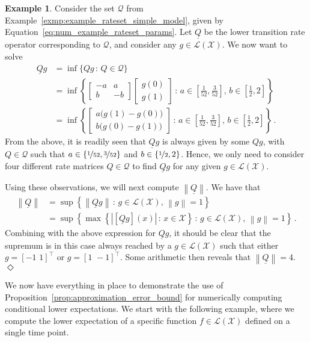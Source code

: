 \documentclass[10pt,a4paper]{paper}
\theoremstyle{definition}
\newtheorem{exmp}{Example}%
\newcommand{\states}{\mathcal{X}}
\newcommand{\gambles}{\mathcal{L}}
\newcommand{\gamblesX}{\gambles(\states)}
\newcommand{\rateset}{\mathcal{Q}}
\newcommand{\lrate}{\underline{Q}}
\newcommand{\norm}[1]{\left\lVert #1 \right\rVert}
\newcommand{\abs}[1]{\left\vert #1 \right\vert}
\newcommand{\exampleend}{\hfill$\Diamond$}
\begin{document}
\begin{exmp}\label{exmp:numerical_lrate}
Consider the set $\rateset$ from Example~\ref{exmp:example_rateset_simple_model}, given by Equation~\eqref{eq:num_example_rateset_params}. Let $\lrate$ be the lower transition rate operator corresponding to $\rateset$, and consider any $g\in\gamblesX$. We now want to solve
\begin{align*}
\lrate g &= \inf\{Qg\,:\,Q\in\rateset\} \\
 &= \inf\left\{\left[\begin{array}{rr}-a & a \\b & -b\end{array}\right]\left[\begin{array}{r} g(0) \\ g(1) \end{array}\right]\,:\,a\in\left[\frac{1}{52}, \frac{3}{52} \right],\,b\in\left[\frac{1}{2}, 2 \right]\right\} \\
 &= \inf\left\{ \left[\begin{array}{r} a\bigl(g(1) - g(0)\bigr) \\ b\bigl(g(0) - g(1) \bigr)\end{array} \right]\,:\,a\in\left[\frac{1}{52}, \frac{3}{52} \right],\,b\in\left[\frac{1}{2}, 2 \right]\right\}\,.
\end{align*}
From the above, it is readily seen that $\lrate g$ is always given by some $Q g$, with $Q\in\rateset$ such that $a\in\{\nicefrac{1}{52}, \nicefrac{3}{52}\}$ and $b\in\{\nicefrac{1}{2},2\}$. Hence, we only need to consider four different rate matrices $Q\in\rateset$ to find $\lrate g$ for any given $g\in\gamblesX$.

Using these observations, we will next compute $\norm{\lrate}$. We have that
\begin{align*}
\norm{\lrate} &= \sup\left\{ \norm{\lrate g}\,:\,g\in\gamblesX,\, \norm{g}=1 \right\} \\
 &= \sup\left\{ \max\left\{\abs{\left[\lrate g\right](x)}\,:\,x\in\states\right\}\,:\,g\in\gamblesX,\, \norm{g}=1 \right\}\,.
\end{align*}
Combining with the above expression for $\lrate g$, it should be clear that the supremum is in this case always reached by a $g\in\gamblesX$ such that either $g=[-1\,\,1]^\top$ or $g=[1\,\,-1]^\top$. Some arithmetic then reveals that $\norm{\lrate}=4$.
\exampleend
\end{exmp}

We now have everything in place to demonstrate the use of Proposition~\ref{prop:approximation_error_bound} for numerically computing conditional lower expectations. We start with the following example, where we compute the lower expectation of a specific function $f\in\gamblesX$ defined on a single time point.
\end{document}
